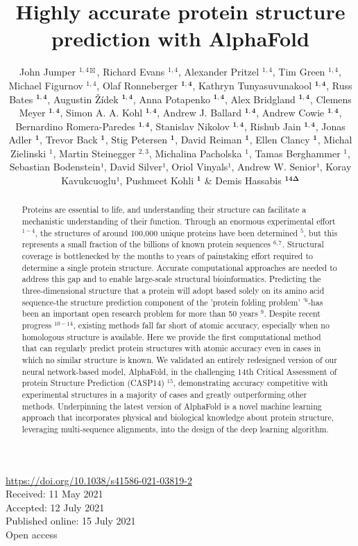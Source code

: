 \documentclass[10pt]{article}
\title{Highly accurate protein structure prediction with AlphaFold }
\author{John Jumper ${ }^{1,4 \boxtimes}$, Richard Evans ${ }^{1,4}$, Alexander Pritzel ${ }^{1,4}$, Tim Green ${ }^{1,4}$, Michael Figurnov ${ }^{1,4}$, Olaf Ronneberger ${ }^{\mathbf{1 , 4}}$, Kathryn Tunyasuvunakool ${ }^{\mathbf{1 , 4}}$, Russ Bates ${ }^{\mathbf{1 , 4}}$, Augustin Žídek ${ }^{\mathbf{1 , 4}}$, Anna Potapenko ${ }^{\mathbf{1 , 4}}$, Alex Bridgland ${ }^{\mathbf{1 , 4}}$, Clemens Meyer ${ }^{\mathbf{1 , 4}}$, Simon A. A. Kohl ${ }^{\mathbf{1 , 4}}$, Andrew J. Ballard ${ }^{\mathbf{1 , 4}}$, Andrew Cowie ${ }^{\mathbf{1 , 4}}$, Bernardino Romera-Paredes ${ }^{\mathbf{1 , 4}}$, Stanislav Nikolov ${ }^{\mathbf{1 , 4}}$, Rishub Jain ${ }^{\mathbf{1} \boldsymbol{,} \mathbf{4}}$, Jonas Adler ${ }^{\mathbf{1}}$, Trevor Back ${ }^{\mathbf{1}}$, Stig Petersen ${ }^{\mathbf{1}}$, David Reiman ${ }^{\mathbf{1}}$, Ellen Clancy ${ }^{\mathbf{1}}$, Michal Zielinski ${ }^{1}$, Martin Steinegger ${ }^{2,3}$, Michalina Pacholska ${ }^{1}$, Tamas Berghammer ${ }^{1}$, Sebastian Bodenstein¹, David Silver¹, Oriol Vinyals¹, Andrew W. Senior¹, Koray Kavukcuoglu¹, Pushmeet Kohli ${ }^{\mathbf{1}}$ \& Demis Hassabis ${ }^{\mathbf{1} \mathbf{4} \boldsymbol{\Delta}}$}
\date{}
\begin{document}
\maketitle
\captionsetup{singlelinecheck=false}
\href{https://doi.org/10.1038/s41586-021-03819-2}{https://doi.org/10.1038/s41586-021-03819-2}\\
Received: 11 May 2021\\
Accepted: 12 July 2021\\
Published online: 15 July 2021\\
Open access



\begin{abstract}
Proteins are essential to life, and understanding their structure can facilitate a mechanistic understanding of their function. Through an enormous experimental effort ${ }^{1-4}$, the structures of around 100,000 unique proteins have been determined ${ }^{5}$, but this represents a small fraction of the billions of known protein sequences ${ }^{6,7}$. Structural coverage is bottlenecked by the months to years of painstaking effort required to determine a single protein structure. Accurate computational approaches are needed to address this gap and to enable large-scale structural bioinformatics. Predicting the three-dimensional structure that a protein will adopt based solely on its amino acid sequence-the structure prediction component of the 'protein folding problem' ${ }^{\prime 6}$-has been an important open research problem for more than 50 years ${ }^{9}$. Despite recent progress ${ }^{10-14}$, existing methods fall far short of atomic accuracy, especially when no homologous structure is available. Here we provide the first computational method that can regularly predict protein structures with atomic accuracy even in cases in which no similar structure is known. We validated an entirely redesigned version of our neural network-based model, AlphaFold, in the challenging 14th Critical Assessment of protein Structure Prediction (CASP14) ${ }^{15}$, demonstrating accuracy competitive with experimental structures in a majority of cases and greatly outperforming other methods. Underpinning the latest version of AlphaFold is a novel machine learning approach that incorporates physical and biological knowledge about protein structure, leveraging multi-sequence alignments, into the design of the deep learning algorithm.
\end{abstract}
\end{document}
